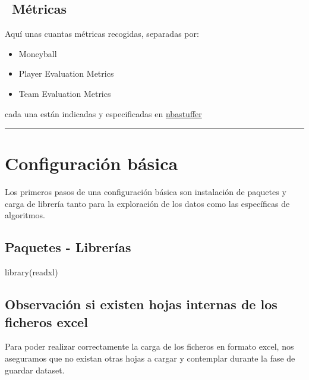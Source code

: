 \documentclass[]{article}
\newenvironment{Shaded}{\begin{snugshade}}{\end{snugshade}}
\newcommand{\KeywordTok}[1]{\textcolor[rgb]{0.94,0.87,0.69}{#1}}
\newcommand{\NormalTok}[1]{\textcolor[rgb]{0.80,0.80,0.80}{#1}}
\providecommand{\tightlist}{%
  \setlength{\itemsep}{0pt}\setlength{\parskip}{0pt}}
\begin{document}
\subsection{~Métricas}\label{metricas}

Aquí unas cuantas métricas recogidas, separadas por:

\begin{itemize}
\tightlist
\item
  Moneyball
\item
  Player Evaluation Metrics
\item
  Team Evaluation Metrics
\end{itemize}

cada una están indicadas y especificadas en
\href{https://www.nbastuffer.com/analytics-101/}{nbastuffer}

\begin{center}\rule{0.5\linewidth}{\linethickness}\end{center}

\section{Configuración básica}\label{configuracion-basica}

Los primeros pasos de una configuración básica son instalación de
paquetes y carga de librería tanto para la exploración de los datos como
las específicas de algoritmos.

\subsection{Paquetes - Librerías}\label{paquetes---librerias}

\begin{Shaded}
\begin{Highlighting}[]
\KeywordTok{library}\NormalTok{(readxl)}
\end{Highlighting}
\end{Shaded}

\subsection{Observación si existen hojas internas de los ficheros
excel}\label{observacion-si-existen-hojas-internas-de-los-ficheros-excel}

Para poder realizar correctamente la carga de los ficheros en formato
excel, nos aseguramos que no existan otras hojas a cargar y contemplar
durante la fase de guardar dataset.
\end{document}

